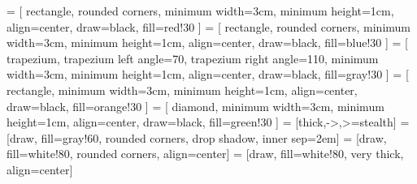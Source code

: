 \usetikzlibrary{shapes,arrows,shadows,positioning,fit,backgrounds,automata}

\tikzset{
    ->,  %
    >=stealth', %
    node distance=3cm %
    }
 = [
    rectangle, rounded corners, minimum width=3cm, minimum height=1cm,
    align=center, draw=black, fill=red!30
    ]
 = [
    rectangle, rounded corners, minimum width=3cm, minimum height=1cm,
    align=center, draw=black, fill=blue!30
    ]
 = [
    trapezium, trapezium left angle=70, trapezium right angle=110, 
    minimum width=3cm, minimum height=1cm, align=center, draw=black,
    fill=gray!30
    ]
 = [
    rectangle, minimum width=3cm, minimum height=1cm, align=center, 
    draw=black, fill=orange!30
    ]
 = [
    diamond, minimum width=3cm, minimum height=1cm, align=center, draw=black,
    fill=green!30
    ]
 = [thick,->,>=stealth]
 = [draw, fill=gray!60, rounded corners, drop shadow,
    inner sep=2em]
 = [draw, fill=white!80, rounded corners, align=center]
 = [draw, fill=white!80, very thick, align=center]